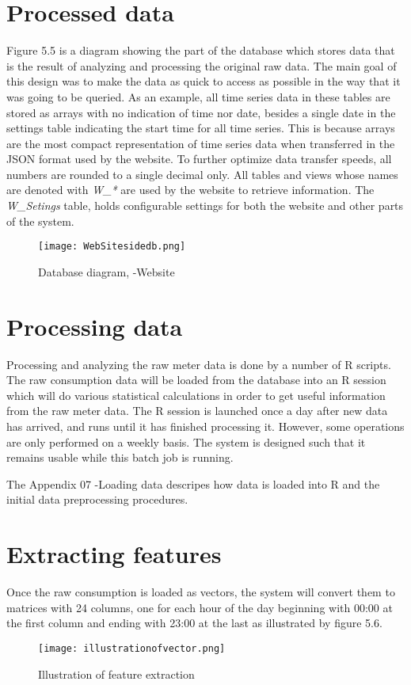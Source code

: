 \section*{Processed data}
Figure 5.5 is a diagram showing the part of the database which stores data that is the result of analyzing and processing the original raw data. The main goal of this design was to make the data as quick to access as possible in the way that it was going to be queried. As an example, all time series data in these tables are stored as arrays with no indication of time nor date, besides a single date in the settings table indicating the start time for all time series. This is because arrays are the most compact representation of time series data when transferred in the JSON format used by the website. To further optimize data transfer speeds, all numbers are rounded to a single decimal only.
All tables and views whose names are denoted with \emph{W\_*} are used by the website to retrieve information. The \emph{W\_Setings} table, holds configurable settings for both the website and other parts of the system.
\begin{figure}
\texttt{[image: WebSitesidedb.png]}
\caption{Database diagram, -Website}
\end{figure}
\section{Processing data}
Processing and analyzing the raw meter data is done by a number of R scripts. The raw consumption data will be loaded from the database into an R session which will do various statistical calculations in order to get useful information from the raw meter data. The R session is launched once a day after new data has arrived, and runs until it has finished processing it. However, some operations are only performed on a weekly basis. The system is designed such that it remains usable while this batch job is running.

The Appendix 07 -Loading data descripes how data is loaded into R and the initial data preprocessing procedures.

\section*{Extracting features}
Once the raw consumption is loaded as vectors, the system will convert them to matrices with 24 columns, one for each hour of the day beginning with 00:00 at the first column and ending with 23:00 at the last as illustrated by figure 5.6. 
\begin{figure}
\texttt{[image: illustrationofvector.png]}
\caption{Illustration of feature extraction}
\end{figure}

